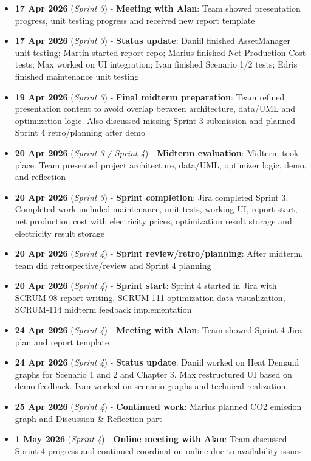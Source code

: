 \begin{itemize}[leftmargin=*,itemsep=0.5em]
\item \textbf{17 Apr 2026} (\textit{Sprint 3}) - \textbf{Meeting with Alan}: Team showed presentation progress, unit testing progress and received new report template
\item \textbf{17 Apr 2026} (\textit{Sprint 3}) - \textbf{Status update}: Daniil finished AssetManager unit testing; Martin started report repo; Marius finished Net Production Cost tests; Max worked on UI integration; Ivan finished Scenario 1/2 tests; Edris finished maintenance unit testing
\item \textbf{19 Apr 2026} (\textit{Sprint 3}) - \textbf{Final midterm preparation}: Team refined presentation content to avoid overlap between architecture, data/UML and optimization logic. Also discussed missing Sprint 3 submission and planned Sprint 4 retro/planning after demo
\item \textbf{20 Apr 2026} (\textit{Sprint 3 / Sprint 4}) - \textbf{Midterm evaluation}: Midterm took place. Team presented project architecture, data/UML, optimizer logic, demo, and reflection
\item \textbf{20 Apr 2026} (\textit{Sprint 3}) - \textbf{Sprint completion}: Jira completed Sprint 3. Completed work included maintenance, unit tests, working UI, report start, net production cost with electricity prices, optimization result storage and electricity result storage
\item \textbf{20 Apr 2026} (\textit{Sprint 4}) - \textbf{Sprint review/retro/planning}: After midterm, team did retrospective/review and Sprint 4 planning
\item \textbf{20 Apr 2026} (\textit{Sprint 4}) - \textbf{Sprint start}: Sprint 4 started in Jira with SCRUM-98 report writing, SCRUM-111 optimization data visualization, SCRUM-114 midterm feedback implementation
\item \textbf{24 Apr 2026} (\textit{Sprint 4}) - \textbf{Meeting with Alan}: Team showed Sprint 4 Jira plan and report template
\item \textbf{24 Apr 2026} (\textit{Sprint 4}) - \textbf{Status update}: Daniil worked on Heat Demand graphs for Scenario 1 and 2 and Chapter 3. Max restructured UI based on demo feedback. Ivan worked on scenario graphs and technical realization.
\item \textbf{25 Apr 2026} (\textit{Sprint 4}) - \textbf{Continued work}: Marius planned CO2 emission graph and Discussion \& Reflection part
\item \textbf{1 May 2026} (\textit{Sprint 4}) - \textbf{Online meeting with Alan}: Team discussed Sprint 4 progress and continued coordination online due to availability issues

\end{itemize}
